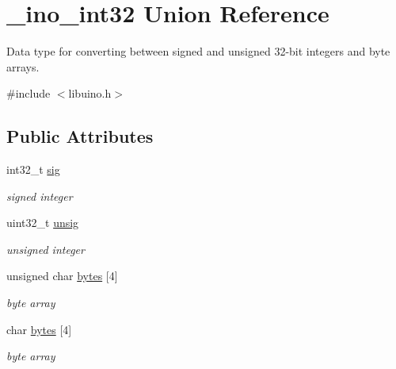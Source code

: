 \hypertarget{union__ino__int32}{\section{\-\_\-ino\-\_\-int32 \-Union \-Reference}
\label{union__ino__int32}
}


\-Data type for converting between signed and unsigned 32-\/bit integers and byte arrays.  




{\ttfamily \#include $<$libuino.\-h$>$}

\subsection*{\-Public \-Attributes}
\begin{DoxyCompactItemize}
\item 
\hypertarget{union__ino__int32_a2b596e3d898610f24b2657ca55f70110}{int32\-\_\-t \hyperlink{union__ino__int32_a2b596e3d898610f24b2657ca55f70110}{sig}}\label{union__ino__int32_a2b596e3d898610f24b2657ca55f70110}

\begin{DoxyCompactList}\small\item\em signed integer \end{DoxyCompactList}\item 
\hypertarget{union__ino__int32_af5cd514ac0440ee19720b1851636c346}{uint32\-\_\-t \hyperlink{union__ino__int32_af5cd514ac0440ee19720b1851636c346}{unsig}}\label{union__ino__int32_af5cd514ac0440ee19720b1851636c346}

\begin{DoxyCompactList}\small\item\em unsigned integer \end{DoxyCompactList}\item 
\hypertarget{union__ino__int32_a330c8e97d566154f5e590af8022c03f6}{unsigned char \hyperlink{union__ino__int32_a330c8e97d566154f5e590af8022c03f6}{bytes} \mbox{[}4\mbox{]}}\label{union__ino__int32_a330c8e97d566154f5e590af8022c03f6}

\begin{DoxyCompactList}\small\item\em byte array \end{DoxyCompactList}\item 
\hypertarget{union__ino__int32_a6e7ad93619b1eb768f702fb0f45d9c98}{char \hyperlink{union__ino__int32_a6e7ad93619b1eb768f702fb0f45d9c98}{bytes} \mbox{[}4\mbox{]}}\label{union__ino__int32_a6e7ad93619b1eb768f702fb0f45d9c98}

\begin{DoxyCompactList}\small\item\em byte array \end{DoxyCompactList}\end{DoxyCompactItemize}


